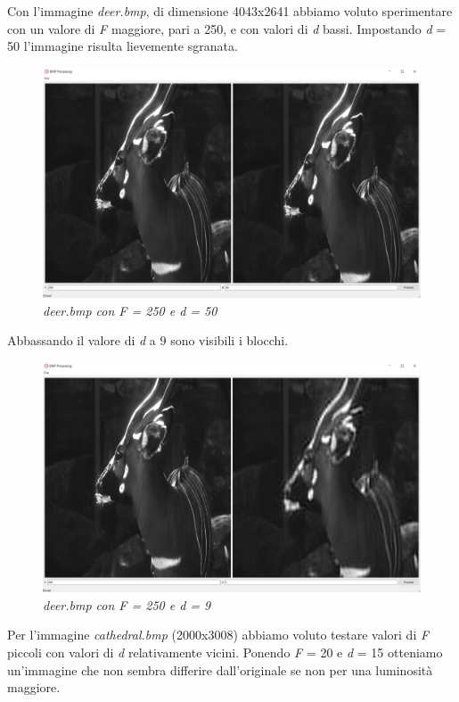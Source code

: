 \documentclass[a4paper,12pt]{report}
\begin{document}
\newpage
\noindent Con l'immagine \textit{deer.bmp}, di dimensione 4043x2641 abbiamo voluto sperimentare con un valore di \textit{F} maggiore, pari a 250, e con valori di \textit{d} bassi.
Impostando \textit{d} = 50 l'immagine risulta lievemente sgranata.

\begin{figure}[H]
\centering
\includegraphics[width=0.8\linewidth]{../img/bambi_250_50.png}
\caption{\textit{deer.bmp con F = 250 e d = 50}}
\end{figure}

Abbassando il valore di \textit{d} a 9 sono visibili i blocchi.

\begin{figure}[H]
\centering
\includegraphics[width=0.8\linewidth]{../img/bambi_250_9.png}
\caption{\textit{deer.bmp con F = 250 e d = 9}}
\end{figure}

\newpage
Per l'immagine \textit{cathedral.bmp} (2000x3008) abbiamo voluto testare valori di \textit{F} piccoli con valori di \textit{d} relativamente vicini.
Ponendo \textit{F} = 20 e \textit{d} = 15 otteniamo un'immagine che non sembra differire dall'originale se non per una luminosità maggiore.
\end{document}

